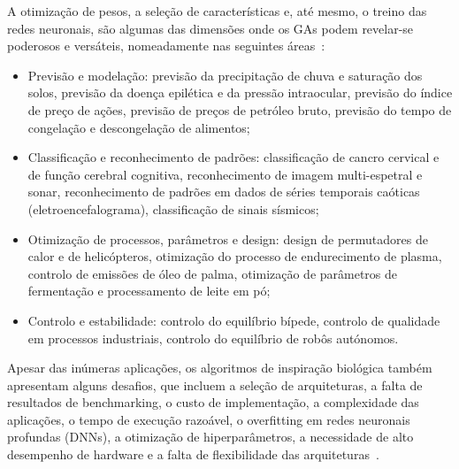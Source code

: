 A otimização de pesos, a seleção de características e, até mesmo, o treino das redes neuronais, são algumas das dimensões onde os GAs podem revelar-se poderosos e versáteis, nomeadamente nas seguintes áreas~\cite{Chiroma2017NeuralReview}:
\begin{itemize}
    \item Previsão e modelação: previsão da precipitação de chuva e saturação dos solos, previsão da doença epilética e da pressão intraocular, previsão do índice de preço de ações, previsão de preços de petróleo bruto, previsão do tempo de congelação e descongelação de alimentos;
    \item Classificação e reconhecimento de padrões: classificação de cancro cervical e de função cerebral cognitiva, reconhecimento de imagem multi-espetral e sonar, reconhecimento de padrões em dados de séries temporais caóticas (eletroencefalograma), classificação de sinais sísmicos;
    \item Otimização de processos, parâmetros e design: design de permutadores de calor e de helicópteros, otimização do processo de endurecimento de plasma, controlo de emissões de óleo de palma, otimização de parâmetros de fermentação e processamento de leite em pó;
    \item Controlo e estabilidade: controlo do equilíbrio bípede, controlo de qualidade em processos industriais, controlo do equilíbrio de robôs autónomos.
\end{itemize}

Apesar das inúmeras aplicações, os algoritmos de inspiração biológica também apresentam alguns desafios, que incluem a seleção de arquiteturas, a falta de resultados de benchmarking, o custo de implementação, a complexidade das aplicações, o tempo de execução razoável, o overfitting em redes neuronais profundas (DNNs), a otimização de hiperparâmetros, a necessidade de alto desempenho de hardware e a falta de flexibilidade das arquiteturas~\cite{Darwish2020ALearning, Mishra2023AAlgorithms}.